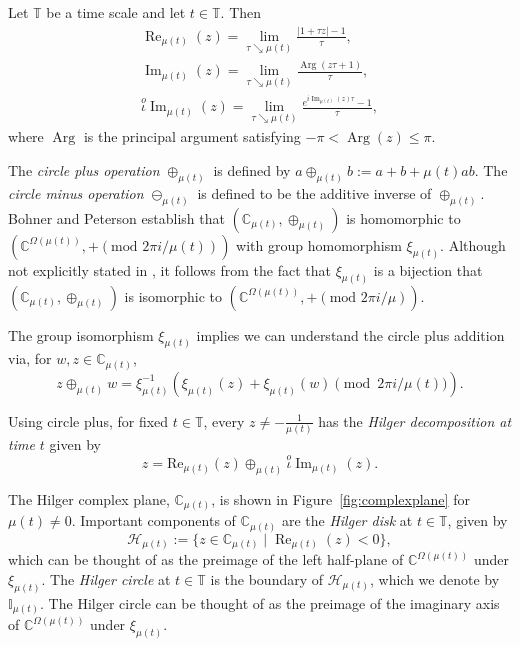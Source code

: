 \documentclass[reqno]{amsart}
\DeclareMathOperator{\myRe}{Re}
\DeclareMathOperator{\myIm}{Im}
\begin{document}
\begin{proposition} \label{lem:HilXi}
Let $\mathbb{T}$ be a time scale and let $t \in \mathbb{T}$. Then
\begin{gather*}
\myRe_{\mu(t)}(z)  = \lim_{\tau \searrow \mu(t)} \frac{|1+\tau z|-1}{\tau}, \\
\myIm_{\mu(t)}(z)  = \lim_{\tau \searrow \mu(t)}\frac{\operatorname{Arg}(z\tau+1)}{\tau}, \\
\stackrel{o}{\iota} \myIm_{\mu(t)}(z)
 = \lim_{\tau \searrow \mu(t)}\frac{e^{i \myIm_{\mu(t)}(z) \tau}-1}{\tau},
\end{gather*}
where $\operatorname{Arg}$ is the principal argument satisfying $-\pi < \operatorname{Arg}(z) \leq \pi$.
\end{proposition}

The \emph{circle plus operation} $\oplus_{\mu(t)}$ is defined by
$a \oplus_{\mu(t)} b:=a+b+\mu(t) ab$. The \emph{circle minus operation}
$\ominus_{\mu(t)}$ is defined to be the additive inverse of $\oplus_{\mu(t)}$.
Bohner and Peterson
\cite[Theorem~2.24]{BoPeD}  establish that $(\mathbb{C}_{\mu(t)}, \oplus_{\mu(t)})$
is homomorphic to $(\mathbb{C}^{\Omega(\mu(t))},+ (\text{mod } 2 \pi i/\mu(t)))$ with
group homomorphism $\xi_{\mu(t)}$. Although not explicitly stated in \cite{BoPeD},
it follows from the fact that
$\xi_{\mu(t)}$ is a bijection that
$(\mathbb{C}_{\mu(t)}, \oplus_{\mu(t)})$ is isomorphic to
$(\mathbb{C}^{\Omega(\mu(t))},+ (\text{mod } 2 \pi i/\mu) )$.

The group isomorphism $\xi_{\mu(t)}$ implies we can understand the circle plus
addition via, for $w,z \in \mathbb{C}_{\mu(t)}$,
\begin{equation}
\label{eq:oplusViaXi}
z \oplus_{\mu(t)} w = \xi_{\mu(t)}^{-1}(\xi_{\mu(t)}(z)
+ \xi_{\mu(t)}(w) \pmod{2 \pi i/\mu(t)}).
\end{equation}

Using circle plus, for fixed $t \in \mathbb{T}$, every $z \neq -\frac{1}{\mu(t)}$ has the
\emph{Hilger decomposition at time $t$} given by
$$
z=\text{Re}_{\mu(t)}(z) \oplus_{\mu(t)} \stackrel{o}{\iota}
\operatorname{Im}_{\mu(t)}(z).
$$

The Hilger complex plane, $\mathbb{C}_{\mu(t)}$, is shown in
Figure~\ref{fig:complexplane} for $\mu(t)\neq 0$.
Important components of $\mathbb{C}_{\mu(t)}$ are the \emph{Hilger disk}
at $t\in \mathbb{T}$, given by
$$
 \mathcal{H}_{\mu(t)} := \{ z \in \mathbb{C}_{\mu(t)} \mid \myRe_{\mu(t)}(z) < 0 \},
$$
which can be thought of as the preimage of the left half-plane of
$\mathbb{C}^{\Omega(\mu(t))}$ under $\xi_{\mu(t)}$.
The \emph{Hilger circle} at $t \in \mathbb{T}$ is the boundary of $\mathcal{H}_{\mu(t)}$,
which we denote by $\mathbb{I}_{\mu(t)}$.
The Hilger circle can be thought of as the preimage of the imaginary axis of
$\mathbb{C}^{\Omega(\mu(t))}$ under $\xi_{\mu(t)}$.
\end{document}
